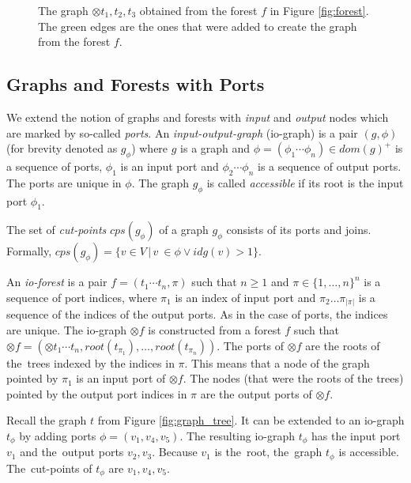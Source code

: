 	\begin{figure}[bth]
	\begin{center}
		
		\caption{The graph $\otimes t_1,t_2,t_3$ obtained from the forest $f$ in Figure \ref{fig:forest}.
		The green edges are the ones that were added to create the graph from the forest $f$.}
	  \label{fig:forest_graph}
	\end{center}
	\end{figure}
\vspace{-0.5cm}
\eexmp

\subsection{Graphs and Forests with Ports}
\label{subsec:gfp}

We extend the notion of graphs and forests with \emph{input} and \emph{output} nodes which are marked by so-called \emph{ports}.
An \emph{input-output-graph} (io-graph) is a pair $(g,\phi)$ (for brevity denoted as $g_\phi$)
where $g$ is a graph and $\phi=(\phi_1 \cdots \phi_n) \in dom(g)^+$ is a sequence of ports, $\phi_1$
is an input port and $\phi_2 \cdots \phi_n$ is a sequence of output ports.
The ports are unique in $\phi$.
The graph $g_\phi$ is called \emph{accessible} if its root is the input port $\phi_1$.

The set of \emph{cut-points} $cps(g_\phi)$ of a graph $g_\phi$ consists of its ports
and joins.
Formally, $cps(g_\phi)=\{v \in V\,|\, v~\in \phi \vee idg(v) > 1\}$.

An \emph{io-forest} is a pair $f=(t_1 \cdots t_n, \pi)$ such that $n \geq 1$ and $\pi \in \{1,\ldots,n\}^n$
is a sequence of port indices, where $\pi_1$ is an index of input port and $\pi_2 \ldots \pi_{|\pi|}$ is a sequence of
the indices of the output ports.
As in the case of ports, the indices are unique.
The io-graph $\otimes f$ is constructed from a forest $f$ such that
$\otimes f = (\otimes t_1 \cdots t_n,root(t_{\pi_{1}}),\ldots,root(t_{\pi_{n}}))$.
The ports of $\otimes f$ are the roots of the~trees indexed by the indices in $\pi$.
This means that a node of the graph pointed by $\pi_1$ is an input port of $\otimes f$.
The nodes (that were the roots of the trees) pointed by the output port indices in $\pi$ are the output ports of $\otimes f$.

\bexmp
Recall the graph $t$ from Figure \ref{fig:graph_tree}.
It can be extended to an io-graph $t_\phi$ by adding ports $\phi=(v_1,v_4,v_5)$.
The resulting io-graph $t_\phi$ has the input port $v_1$ and the~output ports $v_2,v_3$.
Because $v_1$ is the~root, the~graph $t_\phi$ is accessible.
The~cut-points of $t_\phi$ are $v_1, v_4, v_5$.

